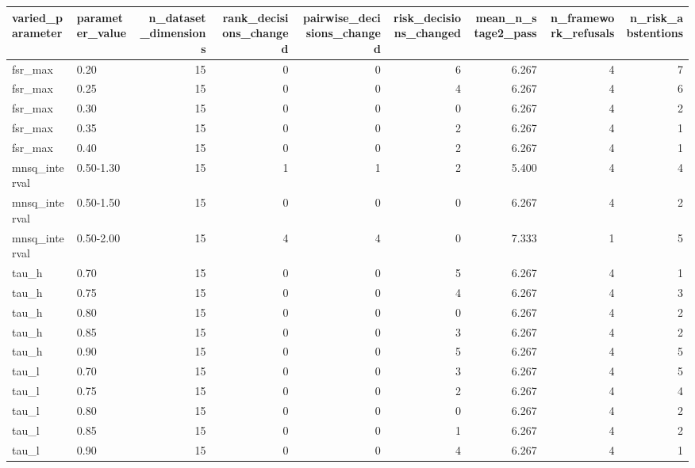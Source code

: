 \begin{tabular}{llrrrrrrr}
\toprule
varied\_parameter & parameter\_value & n\_dataset\_dimensions & rank\_decisions\_changed & pairwise\_decisions\_changed & risk\_decisions\_changed & mean\_n\_stage2\_pass & n\_framework\_refusals & n\_risk\_abstentions \\
\midrule
fsr\_max & 0.20 & 15 & 0 & 0 & 6 & 6.267 & 4 & 7 \\
fsr\_max & 0.25 & 15 & 0 & 0 & 4 & 6.267 & 4 & 6 \\
fsr\_max & 0.30 & 15 & 0 & 0 & 0 & 6.267 & 4 & 2 \\
fsr\_max & 0.35 & 15 & 0 & 0 & 2 & 6.267 & 4 & 1 \\
fsr\_max & 0.40 & 15 & 0 & 0 & 2 & 6.267 & 4 & 1 \\
mnsq\_interval & 0.50-1.30 & 15 & 1 & 1 & 2 & 5.400 & 4 & 4 \\
mnsq\_interval & 0.50-1.50 & 15 & 0 & 0 & 0 & 6.267 & 4 & 2 \\
mnsq\_interval & 0.50-2.00 & 15 & 4 & 4 & 0 & 7.333 & 1 & 5 \\
tau\_h & 0.70 & 15 & 0 & 0 & 5 & 6.267 & 4 & 1 \\
tau\_h & 0.75 & 15 & 0 & 0 & 4 & 6.267 & 4 & 3 \\
tau\_h & 0.80 & 15 & 0 & 0 & 0 & 6.267 & 4 & 2 \\
tau\_h & 0.85 & 15 & 0 & 0 & 3 & 6.267 & 4 & 2 \\
tau\_h & 0.90 & 15 & 0 & 0 & 5 & 6.267 & 4 & 5 \\
tau\_l & 0.70 & 15 & 0 & 0 & 3 & 6.267 & 4 & 5 \\
tau\_l & 0.75 & 15 & 0 & 0 & 2 & 6.267 & 4 & 4 \\
tau\_l & 0.80 & 15 & 0 & 0 & 0 & 6.267 & 4 & 2 \\
tau\_l & 0.85 & 15 & 0 & 0 & 1 & 6.267 & 4 & 2 \\
tau\_l & 0.90 & 15 & 0 & 0 & 4 & 6.267 & 4 & 1 \\
\bottomrule
\end{tabular}
